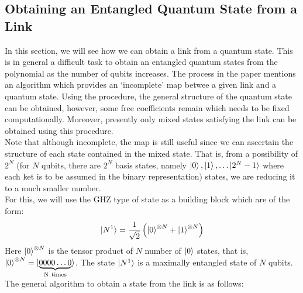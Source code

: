 \documentclass{scrartcl}
\begin{document}
\subsection{Obtaining an Entangled Quantum State from a Link}\label{state_from_link}
In this section, we will see how we can obtain a link from a quantum state. This is in general a difficult task to obtain an entangled quantum states from the polynomial as the number of qubits increases. The process in the paper mentions an algorithm which provides an `incomplete' map betwee a given link and a quantum state. Using the procedure, the general structure of the quantum state can be obtained, however, some free coefficients remain which needs to be fixed computationally. Moreover, presently only mixed states satisfying the link can be obtained using this procedure. \\[0.3cm]
Note that although incomplete, the map is still useful since we can ascertain the structure of each state contained in the mixed state. That is, from a possibility of $2^N$ (for $N$ qubits, there are $2^N$ basis states, namely $\ket{0}, \ket{1}, \ldots \ket{2^N-1}$ where each ket is to be assumed in the binary representation) states, we are reducing it to a much smaller number. \\[0.3cm]
For this, we will use the GHZ type of state as a building block which are of the form:
\begin{align*}
    \ket{N^1} = \frac{1}{\sqrt{2}}\left( \ket{0}^{\otimes N} + \ket{1}^{\otimes N} \right) \\
\end{align*}
Here $\ket{0}^{\otimes N}$ is the tensor product of $N$ number of $\ket{0}$ states, that is, $\ket{0}^{\otimes N} = \ket{\underbrace{0000\ldots0}_{\mathrm{N\ times}}}$. The state $\ket{N^1}$ is a maximally entangled state of $N$ qubits. The general algorithm to obtain a state from the link is as follows:
\end{document}
